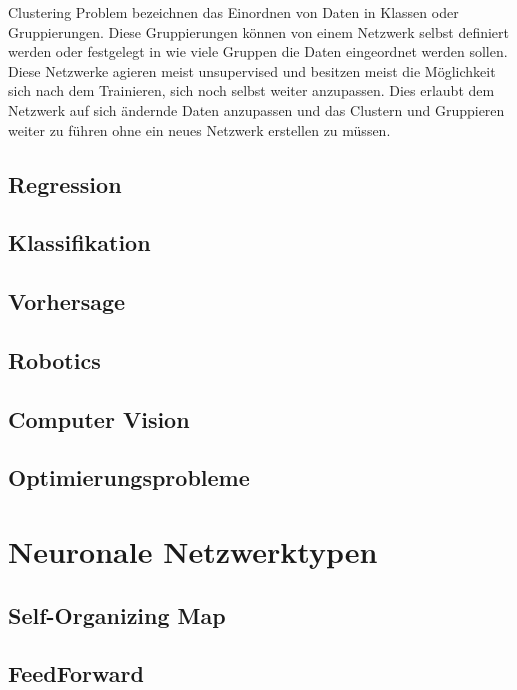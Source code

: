 Clustering Problem bezeichnen das Einordnen von Daten in Klassen oder Gruppierungen. Diese Gruppierungen können von einem Netzwerk selbst definiert werden oder festgelegt in wie viele Gruppen die Daten eingeordnet werden sollen. Diese Netzwerke agieren meist unsupervised und besitzen meist die Möglichkeit sich nach dem Trainieren, sich noch selbst weiter anzupassen. Dies erlaubt dem Netzwerk auf sich ändernde Daten anzupassen und das Clustern und Gruppieren weiter zu führen ohne ein neues Netzwerk erstellen zu müssen.

\subsection{Regression}



\subsection{Klassifikation}

\subsection{Vorhersage}

\subsection{Robotics}

\subsection{Computer Vision}

\subsection{Optimierungsprobleme}


\section{Neuronale Netzwerktypen}

\subsection{Self-Organizing Map}

\subsection{FeedForward}

